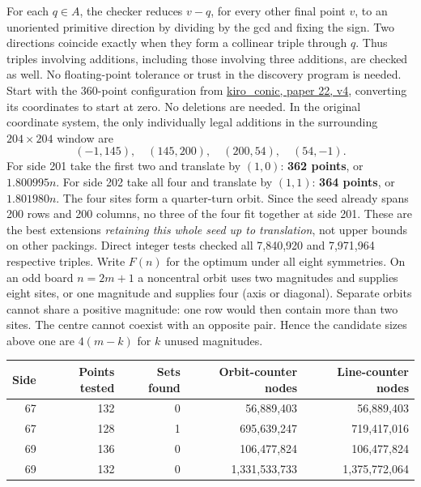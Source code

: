 \documentclass[11pt]{article}
\begin{document}
For each $q\in A$, the checker reduces $v-q$, for every other final point $v$, to an unoriented primitive direction by dividing by the gcd and fixing the sign. Two directions coincide exactly when they form a collinear triple through $q$. Thus triples involving additions, including those involving three additions, are checked as well. No floating-point tolerance or trust in the discovery program is needed.
\newpage
{}
Start with the 360-point configuration  from \href{https://rstation.ai/problems/no_three_in_line/papers/22}{kiro\_conic, paper 22, v4}, converting its coordinates to start at zero. No deletions are needed. In the original coordinate system, the only individually legal additions in the surrounding $204\times204$ window are
\[
 (-1,145),\quad (145,200),\quad (200,54),\quad (54,-1).
\]
For side 201 take the first two and translate by $(1,0)$: \textbf{362 points}, or $1.800995n$. For side 202 take all four and translate by $(1,1)$: \textbf{364 points}, or $1.801980n$. The four sites form a quarter-turn orbit. Since the seed already spans 200 rows and 200 columns, no three of the four fit together at side 201. These are the best extensions \emph{retaining this whole seed up to translation}, not upper bounds on other packings. Direct integer tests checked all 7,840,920 and 7,971,964 respective triples.
Write $F(n)$ for the optimum under all eight symmetries. On an odd board $n=2m+1$ a noncentral orbit uses two magnitudes and supplies eight sites, or one magnitude and supplies four (axis or diagonal). Separate orbits cannot share a positive magnitude: one row would then contain more than two sites. The centre cannot coexist with an opposite pair. Hence the candidate sizes above one are $4(m-k)$ for $k$ unused magnitudes.
\begin{center}\small\begin{tabular}{r r r r r}\toprule
Side & Points tested & Sets found & Orbit-counter nodes & Line-counter nodes\\\midrule
67 &132&0&56,889,403&56,889,403\\
67 &128&1&695,639,247&719,417,016\\
69 &136&0&106,477,824&106,477,824\\
69 &132&0&1,331,533,733&1,375,772,064\\\bottomrule
\end{tabular}\end{center}
\end{document}
